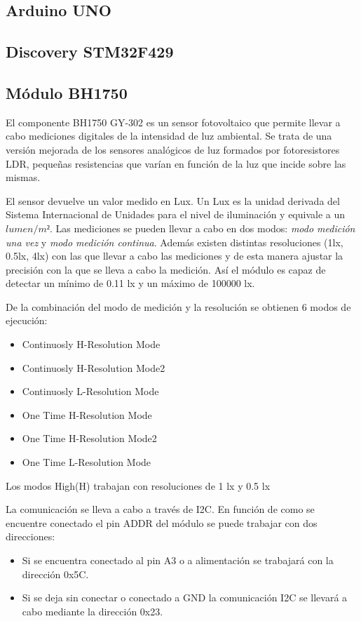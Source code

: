 \subsection{Arduino UNO}\label{subsec:arduino}

\subsection{Discovery STM32F429}\label{subsec:discovery}

\subsection{M\'odulo BH1750}\label{subsec:bh1750}
El componente BH1750 GY-302 es un sensor fotovoltaico que permite
llevar a cabo mediciones digitales de la intensidad de luz
ambiental. Se trata de una versi\'on mejorada de los sensores
anal\'ogicos de luz formados por fotoresistores LDR, peque\~nas resistencias que
var\'ian en funci\'on de la luz que incide sobre las mismas.

El sensor devuelve un valor medido en Lux. Un Lux es la unidad
derivada del Sistema Internacional de Unidades para el nivel de
iluminaci\'on y equivale a un $lumen/m²$. Las mediciones se pueden
llevar a cabo en dos modos: \emph{modo medici\'on una vez} y \emph{modo
  medici\'on continua}. Adem\'as existen distintas resoluciones (1lx,
0.5lx, 4lx) con
las que llevar a cabo las mediciones y de esta manera ajustar la
precisi\'on con la que se lleva a cabo la medici\'on. As\'i el m\'odulo es capaz de detectar un
m\'inimo de 0.11 lx y un m\'aximo de 100000 lx. 

De la combinaci\'on del modo de medici\'on y la resoluci\'on se
obtienen 6 modos de ejecuci\'on:
\begin{itemize}
\item Continuosly H-Resolution Mode
\item Continuosly H-Resolution Mode2
\item Continuosly L-Resolution Mode
\item One Time H-Resolution Mode
\item One Time H-Resolution Mode2
\item One Time L-Resolution Mode
\end{itemize}

Los modos High(H) trabajan con resoluciones de 1 lx y 0.5 lx 

La comunicaci\'on se lleva a cabo a trav\'es de I2C. En funci\'on de
como se encuentre conectado el pin ADDR del m\'odulo se puede trabajar
con dos direcciones:
\begin{itemize}
\item Si se encuentra conectado al pin A3 o a alimentaci\'on se
  trabajar\'a con la direcci\'on 0x5C.
\item Si se deja sin conectar o conectado a GND la comunicaci\'on I2C
  se llevar\'a a cabo mediante la direcci\'on 0x23.
\end{itemize}

